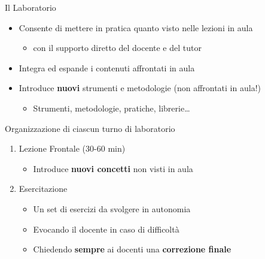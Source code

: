 \documentclass[presentation]{beamer}
\begin{document}
\begin{frame}{Il Laboratorio}

\begin{itemize}
    \item Consente di mettere in pratica quanto visto nelle lezioni in aula
    \begin{itemize}
        \item con il supporto diretto del docente e del tutor
    \end{itemize}
    \item Integra ed espande i contenuti affrontati in aula
    \item Introduce \textbf{nuovi} strumenti e metodologie (non affrontati in aula!)
    \begin{itemize}
        \item Strumenti, metodologie, pratiche, librerie\dots{}
    \end{itemize}
\end{itemize}

\begin{block}{Organizzazione di ciascun turno di laboratorio}
    \begin{enumerate}
        \item Lezione Frontale (30-60 min)
        \begin{itemize}
            \item Introduce \textbf{nuovi concetti} non visti in aula
        \end{itemize}
        \item Esercitazione
        \begin{itemize}
            \item Un set di esercizi da svolgere in autonomia
            \item Evocando il docente in caso di difficoltà
            \item Chiedendo \textbf{sempre} ai docenti una \textbf{correzione finale}
        \end{itemize}
    \end{enumerate}
\end{block}
\end{frame}
\end{document}
